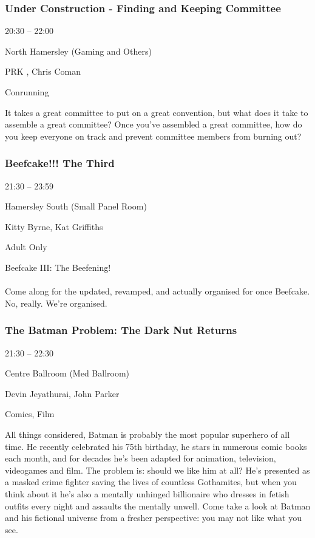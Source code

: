 \documentclass{scrreprt}
\begin{document}
\begin{multicols}{2}
\subsubsection*{Under Construction - Finding and Keeping Committee}\begin{description}
\setlength{\itemsep}{0pt}
\setlength{\parsep}{0pt}
\setlength{\parskip}{0pt}
\item[Time:]{20:30 -- 22:00}
\item[Venue:]{North Hamersley (Gaming and Others)}
\item[People:]{PRK , Chris Coman}
\item[Tags:]{Conrunning}\end{description}
It takes a great committee to put on a great convention, but what does it take to assemble a great committee? Once you've assembled a great committee, how do you keep everyone on track and prevent committee members from burning out?
\subsubsection*{Beefcake!!! The Third}\begin{description}
\setlength{\itemsep}{0pt}
\setlength{\parsep}{0pt}
\setlength{\parskip}{0pt}
\item[Time:]{21:30 -- 23:59}
\item[Venue:]{Hamersley South (Small Panel Room)}
\item[People:]{Kitty Byrne, Kat Griffiths}
\item[Tags:]{Adult Only}\end{description}
Beefcake III: The Beefening!\\\\Come along for the updated, revamped, and actually organised for once Beefcake. No, really. We're organised.
\subsubsection*{The Batman Problem: The Dark Nut Returns}\begin{description}
\setlength{\itemsep}{0pt}
\setlength{\parsep}{0pt}
\setlength{\parskip}{0pt}
\item[Time:]{21:30 -- 22:30}
\item[Venue:]{Centre Ballroom (Med Ballroom)}
\item[People:]{Devin Jeyathurai, John Parker}
\item[Tags:]{Comics, Film}\end{description}
All things considered, Batman is probably the most popular superhero of all time. He recently celebrated his 75th birthday, he stars in numerous comic books each month, and for decades he’s been adapted for animation, television, videogames and film. The problem is: should we like him at all? He’s presented as a masked crime fighter saving the lives of countless Gothamites, but when you think about it he’s also a mentally unhinged billionaire who dresses in fetish outfits every night and assaults the mentally unwell. Come take a look at Batman and his fictional universe from a fresher perspective: you may not like what you see.

\end{multicols}
\end{document}

